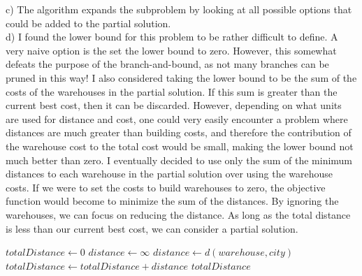 \documentclass{article}
\begin{document}
c) The algorithm expands the subproblem by looking at all possible options that could be added to the partial solution. \\

d) I found the lower bound for this problem to be rather difficult to define. A very naive option is the set the lower bound to zero. However, this somewhat defeats the purpose of the branch-and-bound, as not many branches can be pruned in this way! I also considered taking the lower bound to be the sum of the costs of the warehouses in the partial solution. If this sum is greater than the current best cost, then it can be discarded. However, depending on what units are used for distance and cost, one could very easily encounter a problem where distances are much greater than building costs, and therefore the contribution of the warehouse cost to the total cost would be small, making the lower bound not much better than zero. I eventually decided to use only the sum of the minimum distances to each warehouse in the partial solution over using the warehouse costs. If we were to set the costs to build warehouses to zero, the objective function would become to minimize the sum of the distances. By ignoring the warehouses, we can focus on reducing the distance. As long as the total distance is less than our current best cost, we can consider a partial solution.\\

\begin{algorithm}
\begin{algorithmic}[1]
	\State $totalDistance \gets 0$
		\State $distance \gets \infty$
				\State $distance \gets d(warehouse, city)$
			\EndIf
		\EndFor
		\State $totalDistance \gets totalDistance + distance$
	\EndFor
	\State \Return $totalDistance$
\EndFunction
\end{algorithmic}
\end{algorithm}
\end{document}
